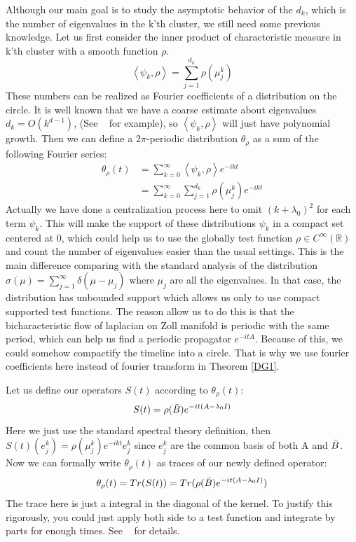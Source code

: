 \documentclass[10pt]{amsart}
\newcommand{\R}{{\mathbb R}}
\newcommand{\1}{\mathbb{1}}
\begin{document}
Although our main goal is to study the asymptotic behavior of the $d_k$, which is the number of eigenvalues in the k'th cluster, we still need some previous knowledge. Let us first consider the inner product of characteristic measure in k'th cluster with a smooth function $\rho$.
\begin{equation}\label{fc}
\left \langle \psi_k , \rho\right \rangle = \sum_{j=1}^{d_k} \rho (\mu_j^k)
\end{equation}
These numbers can be realized as Fourier coefficients of a distribution on the circle. It is well known that we have a coarse estimate about eigenvalues $d_k = O(k^{d-1})$, (See ~\cite{soggefica} for example), so $\left \langle \psi_k , \rho\right \rangle$ will just have polynomial growth. Then we can define a $2\pi$-periodic distribution $\theta_{\rho}$ as a sum of the following Fourier series:
\begin{align}
    \theta_{\rho} (t) &=\sum_{k=0}^{\infty} \left \langle \psi_k , \rho\right \rangle  e^{-ikt}\\
    &=\sum_{k=0}^{\infty} \sum_{j=1}^{d_k} \rho (\mu_j^k) e^{-ikt}
\end{align}
Actually we have done a centralization process here to omit $(k+\lambda_0)^2$ for each term $\psi_k$. This will make the support of these distributions $\psi_k$ in a compact set centered at 0, which could help us to use the globally test function $\rho \in C^{\infty}(\R)$ and count the number of eigenvalues easier than the usual settings. This is the main difference comparing with the standard analysis of the distribution $\sigma(\mu) = \sum_{j=1}^{\infty} \delta(\mu -\mu_j)$ where $\mu_j$ are all the eigenvalues. In that case, the distribution has unbounded support which allows us only to use compact supported test functions. The reason allow us to do this is that the bicharacteristic flow of laplacian on Zoll manifold is periodic with the same period, which can help us find a periodic propagator $e^{-itA}$. Because of this, we could somehow compactify the timeline into a circle. That is why we use fourier coefficients here instead of fourier transform in Theorem \ref{DG1}.

Let us define our operators $S(t)$ according to $\theta_{\rho} (t)$:
\begin{equation}
    S(t) = \rho(\Bar{B}) e^{-it(A-\lambda_0I)}
\end{equation}
Here we just use the standard spectral theory definition, then $S(t)(e_j^k) = \rho(\mu_j^k) e^{-ikt} e_j^k$ since $e_j^k$ are the common basis of both A and $\Bar{B}$. Now we can formally write $\theta_{\rho}(t)$ as traces of our newly defined operator:
\begin{equation}
    \theta_{\rho}(t) = Tr (S(t)) = Tr (\rho(\Bar{B}) e^{-it(A-\lambda_0I)})
\end{equation}
The trace here is just a integral in the diagonal of the kernel. To justify this rigorously, you could just apply both side to a test function and integrate by parts for enough times. See ~\cite{DuistermaatGuillemin} for details.
\end{document}
